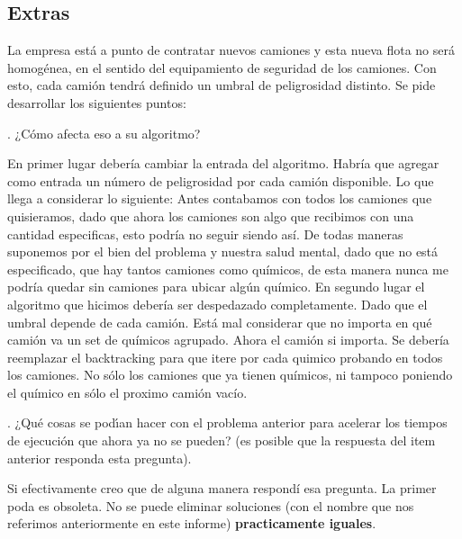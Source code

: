 \subsection{Extras}

\noindent 
La empresa est\'a a punto de contratar nuevos camiones y esta nueva flota no ser\'a homog\'enea, en el sentido del equipamiento de seguridad de los camiones. Con esto, cada cami\'on tendr\'a definido un umbral de peligrosidad distinto. Se pide desarrollar los siguientes puntos:

. ¿C\'omo afecta eso a su algoritmo?

\noindent 
En primer lugar deber\'ia cambiar la entrada del algoritmo. Habr\'ia que agregar como entrada un n\'umero de peligrosidad por cada cami\'on disponible. Lo que llega a considerar lo siguiente: 
Antes contabamos con todos los camiones que quisieramos, dado que ahora los camiones son algo que recibimos con una cantidad especificas, esto podr\'ia no seguir siendo as\'i. De todas maneras suponemos por el bien del problema y nuestra salud mental, dado que no est\'a especificado, que hay tantos camiones como qu\'imicos, de esta manera nunca me podr\'ia quedar sin camiones para ubicar alg\'un qu\'imico.
En segundo lugar el algoritmo que hicimos deber\'ia ser despedazado completamente. Dado que el umbral depende de cada cami\'on. Est\'a mal considerar que no importa en qu\'e cami\'on va un set de qu\'imicos agrupado. Ahora el cami\'on si importa. Se deber\'ia reemplazar el backtracking para que itere por cada quimico probando en todos los camiones. No s\'olo los camiones que ya tienen qu\'imicos, ni tampoco poniendo el qu\'imico en s\'olo el proximo cami\'on vac\'io.

. ¿Qu\'e cosas se pod\'ıan hacer con el problema anterior para acelerar los tiempos de ejecuci\'on que ahora ya no se pueden? (es posible que la respuesta del item anterior responda esta pregunta).

Si efectivamente creo que de alguna manera respond\'i esa pregunta. La primer poda es obsoleta. No se puede eliminar soluciones (con el nombre que nos referimos anteriormente en este informe) \textbf{practicamente iguales}. 
 


